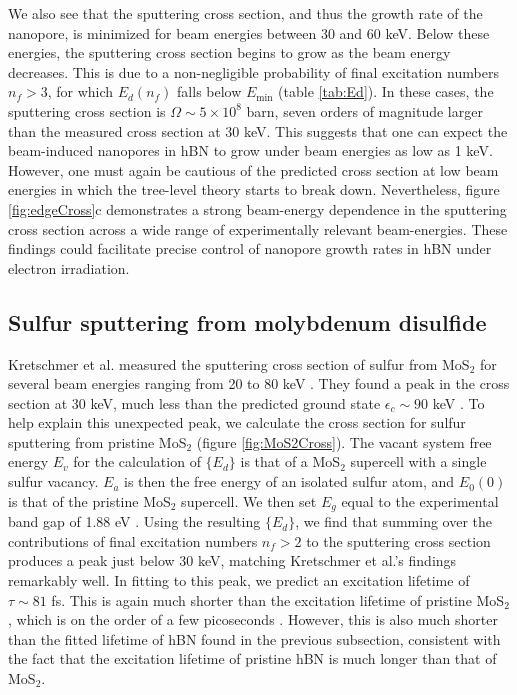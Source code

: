 \documentclass{article}
\begin{document}
We also see that the sputtering cross section, and thus the growth rate of the
nanopore, is minimized for beam energies between 30 and 60 keV.
Below these energies, the sputtering cross section begins to grow as the beam
energy decreases.
This is due to a non-negligible probability of final excitation numbers $n_f >
3$, for which $E_d(n_f)$ falls below $E_\text{min}$ (table \ref{tab:Ed}).
In these cases, the sputtering cross section is $\Omega \sim 5\times10^8$ barn,
seven orders of magnitude larger than the measured cross section at 30 keV.
This suggests that one can expect the beam-induced nanopores in hBN to grow under
beam energies as low as 1 keV.
However, one must again be cautious of the predicted cross section at low beam
energies in which the tree-level theory starts to break down.
Nevertheless, figure \ref{fig:edgeCross}c demonstrates a strong beam-energy
dependence in the sputtering cross section across a wide range of
experimentally relevant beam-energies.
These findings could facilitate precise control of nanopore growth rates in hBN
under electron irradiation.

\subsection{Sulfur sputtering from molybdenum disulfide}
\label{sec:MoS2}

Kretschmer et al. measured the sputtering cross section of sulfur from MoS$_2$
for several beam energies ranging from 20 to 80 keV \cite{Kretschmer2020}.
They found a peak in the cross section at 30 keV, much less than the predicted
ground state $\epsilon_c\sim 90$ keV \cite{Kretschmer2020}.
To help explain this unexpected peak, we calculate the cross section for sulfur
sputtering from pristine MoS$_2$ (figure \ref{fig:MoS2Cross}).
The vacant system free energy $E_v$ for the calculation of $\{E_d\}$ is that of a
MoS$_2$ supercell with a single sulfur vacancy.
$E_a$ is then the free energy of an isolated sulfur atom, and $E_0(0)$ is that
of the pristine MoS$_2$ supercell.
We then set $E_g$ equal to the experimental band gap of 1.88 eV
\cite{Gusakova2017}.
Using the resulting $\{E_d\}$, we find that summing over the contributions
of final excitation numbers $n_f > 2$ to the sputtering cross section produces
a peak just below 30 keV, matching Kretschmer et al.'s findings remarkably
well.
In fitting to this peak, we predict an excitation lifetime of $\tau \sim 81$
fs.
This is again much shorter than the excitation lifetime of pristine MoS$_2$,
which is on the order of a few picoseconds \cite{Korn2011, Lagarde2014,
Palummo2015a}.
However, this is also much shorter than the fitted lifetime of hBN found in the
previous subsection, consistent with the fact that the excitation lifetime of
pristine hBN is much longer than that of MoS$_2$.
\end{document}
